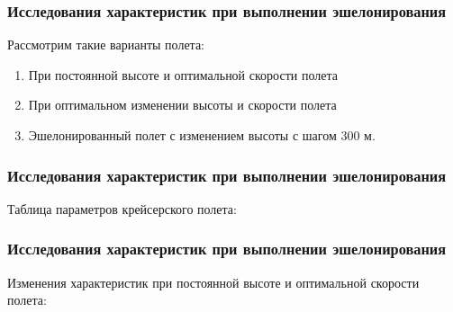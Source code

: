 \documentclass{beamer}
\begin{document}
\begin{frame}[t]
    \frametitle{Исследования характеристик при выполнении эшелонирования}
    \begin{center}
        \begin{minipage}{0.9\textwidth}
            \begin{block}{Рассмотрим такие варианты полета:}
                \begin{enumerate}
                    \item При постоянной высоте и оптимальной скорости полета 
                    \item При оптимальном изменении высоты и скорости полета
                    \item Эшелонированный полет с изменением высоты с шагом 300 м.
                \end{enumerate}
            \end{block}
        \end{minipage}
    \end{center}

\end{frame}

\begin{frame}[t]
    \frametitle{Исследования характеристик при выполнении эшелонирования}
    \begin{center}
        \vspace{-0.5cm}
        Таблица параметров крейсерского полета:
        \begin{minipage}{\textwidth}
            \begin{table}[H]
                \centering
                \resizebox{0.65\textwidth}{!}{}
            \end{table}
        \end{minipage}
    \end{center}
\end{frame}

\begin{frame}[t]
    \frametitle{Исследования характеристик при выполнении эшелонирования}
    \begin{center}
        Изменения характеристик при постоянной высоте и оптимальной скорости полета:

        \begin{minipage}{0.49\textwidth}
            \centering
            \resizebox{1.0\textwidth}{!}{}
        \end{minipage}
        \hfill
        \begin{minipage}{0.49\textwidth}
            \centering
            \resizebox{1.0\textwidth}{!}{}
        \end{minipage}
    \end{center}
\end{frame}
\end{document}
